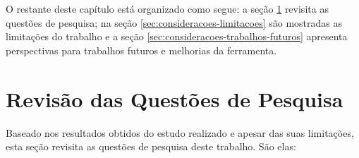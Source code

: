 O restante deste capítulo está organizado como segue: a seção \ref{sec:consideracoes-questoes-pesquisa} revisita as questões de pesquisa; na seção \ref{sec:consideracoes-limitacoes} são mostradas as limitações do trabalho e a seção \ref{sec:consideracoes-trabalhos-futuros} apresenta perspectivas para trabalhos futuros e melhorias da ferramenta.

\section{Revisão das Questões de Pesquisa} \label{sec:consideracoes-questoes-pesquisa}

Baseado nos resultados obtidos do estudo realizado e apesar das suas limitações, esta seção revisita as questões de pesquisa deste trabalho. São elas:

